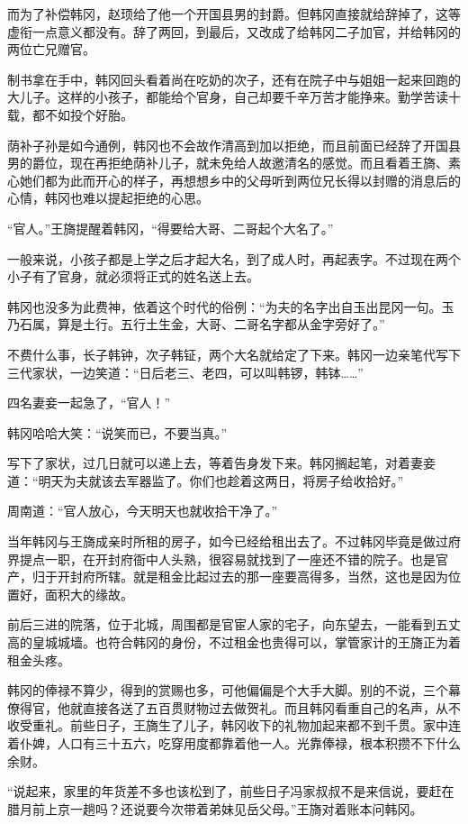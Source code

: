 而为了补偿韩冈，赵顼给了他一个开国县男的封爵。但韩冈直接就给辞掉了，这等虚衔一点意义都没有。辞了两回，到最后，又改成了给韩冈二子加官，并给韩冈的两位亡兄赠官。

制书拿在手中，韩冈回头看着尚在吃奶的次子，还有在院子中与姐姐一起来回跑的大儿子。这样的小孩子，都能给个官身，自己却要千辛万苦才能挣来。勤学苦读十载，都不如投个好胎。

荫补子孙是如今通例，韩冈也不会故作清高到加以拒绝，而且前面已经辞了开国县男的爵位，现在再拒绝荫补儿子，就未免给人故邀清名的感觉。而且看着王旖、素心她们都为此而开心的样子，再想想乡中的父母听到两位兄长得以封赠的消息后的心情，韩冈也难以提起拒绝的心思。

“官人。”王旖提醒着韩冈，“得要给大哥、二哥起个大名了。”

一般来说，小孩子都是上学之后才起大名，到了成人时，再起表字。不过现在两个小子有了官身，就必须将正式的姓名送上去。

韩冈也没多为此费神，依着这个时代的俗例：“为夫的名字出自玉出昆冈一句。玉乃石属，算是土行。五行土生金，大哥、二哥名字都从金字旁好了。”

不费什么事，长子韩钟，次子韩钲，两个大名就给定了下来。韩冈一边亲笔代写下三代家状，一边笑道：“日后老三、老四，可以叫韩锣，韩钵……”

四名妻妾一起急了，“官人！”

韩冈哈哈大笑：“说笑而已，不要当真。”

写下了家状，过几日就可以递上去，等着告身发下来。韩冈搁起笔，对着妻妾道：“明天为夫就该去军器监了。你们也趁着这两日，将房子给收拾好。”

周南道：“官人放心，今天明天也就收拾干净了。”

当年韩冈与王旖成亲时所租的房子，如今已经给租出去了。不过韩冈毕竟是做过府界提点一职，在开封府衙中人头熟，很容易就找到了一座还不错的院子。也是官产，归于开封府所辖。就是租金比起过去的那一座要高得多，当然，这也是因为位置好，面积大的缘故。

前后三进的院落，位于北城，周围都是官宦人家的宅子，向东望去，一能看到五丈高的皇城城墙。也符合韩冈的身份，不过租金也贵得可以，掌管家计的王旖正为着租金头疼。

韩冈的俸禄不算少，得到的赏赐也多，可他偏偏是个大手大脚。别的不说，三个幕僚得官，他就直接各送了五百贯财物过去做贺礼。而且韩冈看重自己的名声，从不收受重礼。前些日子，王旖生了儿子，韩冈收下的礼物加起来都不到千贯。家中连着仆婢，人口有三十五六，吃穿用度都靠着他一人。光靠俸禄，根本积攒不下什么余财。

“说起来，家里的年货差不多也该松到了，前些日子冯家叔叔不是来信说，要赶在腊月前上京一趟吗？还说要今次带着弟妹见岳父母。”王旖对着账本问韩冈。

